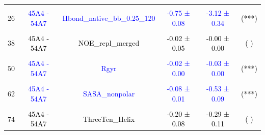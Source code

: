 \documentclass{article}\usepackage[table]{xcolor}
\renewcommand{\$}{$} %
\begin{document}
\begin{center}
\begin{longtable}[t]{lccccc}
\cellcolor{gray!6}{20} & \cellcolor{gray!6}{\textcolor{blue}{45A4 - 54A7}} & \cellcolor{gray!6}{\textcolor{blue}{Hbond\_bb\_0.25\_120}} & \cellcolor{gray!6}{\textcolor{blue}{-0.50 ± 0.06}} & \cellcolor{gray!6}{\textcolor{blue}{-2.46 ± 0.28}} & \cellcolor{gray!6}{\textcolor{black}{(***)}}\\
26 & \textcolor{blue}{45A4 - 54A7} & \textcolor{blue}{Hbond\_native\_bb\_0.25\_120} & \textcolor{blue}{-0.75 ± 0.08} & \textcolor{blue}{-3.12 ± 0.34} & \textcolor{black}{(***)}\\
\cellcolor{gray!6}{32} & \cellcolor{gray!6}{\textcolor{black}{45A4 - 54A7}} & \cellcolor{gray!6}{\textcolor{black}{Jvalue}} & \cellcolor{gray!6}{\textcolor{black}{0.11 ± 0.09}} & \cellcolor{gray!6}{\textcolor{black}{0.09 ± 0.07}} & \cellcolor{gray!6}{\textcolor{black}{( )}}\\
38 & \textcolor{black}{45A4 - 54A7} & \textcolor{black}{NOE\_repl\_merged} & \textcolor{black}{-0.02 ± 0.05} & \textcolor{black}{-0.00 ± 0.00} & \textcolor{black}{( )}\\
\cellcolor{gray!6}{44} & \cellcolor{gray!6}{\textcolor{black}{45A4 - 54A7}} & \cellcolor{gray!6}{\textcolor{black}{Pi\_Helix}} & \cellcolor{gray!6}{\textcolor{black}{0.12 ± 0.11}} & \cellcolor{gray!6}{\textcolor{black}{0.13 ± 0.13}} & \cellcolor{gray!6}{\textcolor{black}{( )}}\\
50 & \textcolor{blue}{45A4 - 54A7} & \textcolor{blue}{Rgyr} & \textcolor{blue}{-0.02 ± 0.00} & \textcolor{blue}{-0.03 ± 0.00} & \textcolor{black}{(***)}\\
\cellcolor{gray!6}{56} & \cellcolor{gray!6}{\textcolor{blue}{45A4 - 54A7}} & \cellcolor{gray!6}{\textcolor{blue}{RMSD.ADJ}} & \cellcolor{gray!6}{\textcolor{blue}{0.32 ± 0.08}} & \cellcolor{gray!6}{\textcolor{blue}{0.01 ± 0.01}} & \cellcolor{gray!6}{\textcolor{black}{(**)}}\\
62 & \textcolor{blue}{45A4 - 54A7} & \textcolor{blue}{SASA\_nonpolar} & \textcolor{blue}{-0.08 ± 0.01} & \textcolor{blue}{-0.53 ± 0.09} & \textcolor{black}{(***)}\\
\cellcolor{gray!6}{68} & \cellcolor{gray!6}{\textcolor{blue}{45A4 - 54A7}} & \cellcolor{gray!6}{\textcolor{blue}{SASA\_polar}} & \cellcolor{gray!6}{\textcolor{blue}{-0.16 ± 0.01}} & \cellcolor{gray!6}{\textcolor{blue}{-1.35 ± 0.12}} & \cellcolor{gray!6}{\textcolor{black}{(***)}}\\
74 & \textcolor{black}{45A4 - 54A7} & \textcolor{black}{ThreeTen\_Helix} & \textcolor{black}{-0.20 ± 0.08} & \textcolor{black}{-0.29 ± 0.11} & \textcolor{black}{( )}\\

\end{longtable}
\end{center}
\end{document}
